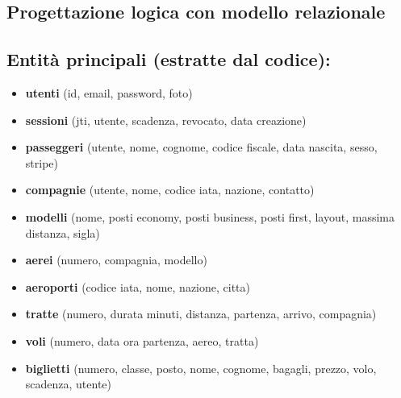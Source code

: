 \documentclass[12pt,a4paper]{article}
\begin{document}
\noindent
\begin{minipage}{\linewidth}
  \centering
  \begin{subfigure}{\linewidth}
    \centering
    
  \end{subfigure}
\end{minipage}

\subsection{Progettazione logica con modello relazionale}
\label{sec:schema relazionale}

\noindent
\begin{minipage}{\linewidth}
  \centering
  \begin{subfigure}{\linewidth}
    \centering
    
  \end{subfigure}
\end{minipage}

\newpage

\subsection{Entità principali (estratte dal codice):}
\begin{itemize}[noitemsep]
	\item \textbf{utenti} (id, email, password, foto)
	\item \textbf{sessioni} (jti, utente, scadenza, revocato, data creazione)
	\item \textbf{passeggeri} (utente, nome, cognome, codice fiscale, data nascita, sesso, stripe)
	\item \textbf{compagnie} (utente, nome, codice iata, nazione, contatto)
	\item \textbf{modelli} (nome, posti economy, posti business, posti first, layout, massima distanza, sigla)
	\item \textbf{aerei} (numero, compagnia, modello)
	\item \textbf{aeroporti} (codice iata, nome, nazione, citta)
	\item \textbf{tratte} (numero, durata minuti, distanza, partenza, arrivo, compagnia)
	\item \textbf{voli} (numero, data ora partenza, aereo, tratta)
	\item \textbf{biglietti} (numero, classe, posto, nome, cognome, bagagli, prezzo, volo, scadenza, utente)
\end{itemize}
\end{document}
